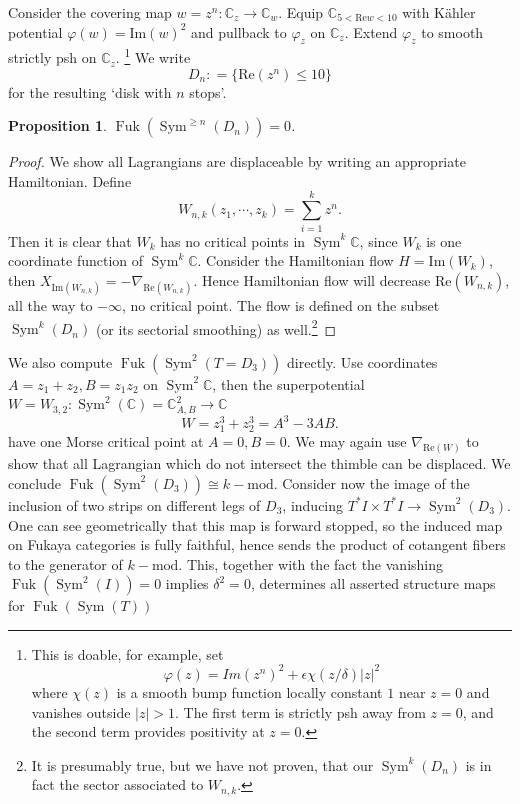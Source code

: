\documentclass{article}
\def\C{\mathbb{C}}
\DeclareMathOperator{\Sym}{Sym}
\DeclareMathOperator{\Fuk}{Fuk}
\renewcommand{\Im}{\mathrm{Im}}
\renewcommand{\Re}{\mathrm{Re}}
\newtheorem{proposition}[theorem]{Proposition}
\theoremstyle{definition}
\begin{document}
Consider the covering map $w=z^n : \C_z \to \C_w$. Equip $\C_{5 < \Re w < 10}$ with K\"ahler potential $\varphi(w) = \Im(w)^2$ and pullback to $\varphi_z$ on $\C_z$. Extend 
    $\varphi_z$ to smooth strictly psh on $\C_z$. \footnote{This is doable, for example, set
    $$ \varphi(z) = Im(z^n)^2 + \epsilon \chi(z/\delta) |z|^2 $$
    where $\chi(z)$ is a smooth bump function locally constant $1$ near $z=0$ and vanishes outside $|z|>1$. The first term is strictly psh away from $z=0$, and the second term provides positivity at $z=0$.}
    We write  
    $$D_n: = \{ \Re(z^n) \leq 10\}$$ for the resulting  `disk with $n$ stops'. 
    
\begin{proposition}
    $\Fuk (\Sym^{\ge n}(D_n))=0$. 
\end{proposition}
\begin{proof}
    We show all Lagrangians are displaceable by writing an appropriate Hamiltonian. 
    Define 
    $$ W_{n,k} (z_1, \cdots, z_k) = \sum_{i=1}^k z^n. $$
    Then it is clear that $W_k$ has no critical points in $\Sym^k \C$, since $W_k$ is one coordinate function of $\Sym^k \C$.
    Consider the Hamiltonian flow $H = \Im(W_k)$, then $X_{\Im(W_{n,k})} = -\nabla_{\Re(W_{n,k})}$. Hence Hamiltonian flow will decrease $\Re(W_{n,k})$, all the way to $-\infty$, no critical point. The flow is defined on the subset $\Sym^k(D_n)$ (or its sectorial smoothing) as well.\footnote{It is presumably true, but we have not proven, that our $\Sym^{k}(D_n)$ is in fact the sector associated to $W_{n,k}$.} 
\end{proof}

We also compute $\Fuk(\Sym^2(T=D_3))$ directly. Use coordinates $A=z_1+z_2, B=z_1 z_2$ on $\Sym^2 \C$, then the superpotential $W=W_{3,2}:\Sym^2(\C) = \C^2_{A,B} \to \C$
$$ W=z_1^3 + z_2^3 =  A^3 - 3 AB. $$ 
have one Morse critical point at $A=0, B=0$. We may again use $\nabla_{\Re(W)}$ to show that all Lagrangian which do not intersect the thimble can be displaced. We conclude $\Fuk(\Sym^2(D_3)) \cong k-\mathrm{mod}$.  Consider now the image of the inclusion of two strips on different legs of $D_3$, inducing $T^*I \times T^*I \to \Sym^2(D_3)$.  One can see geometrically that this map is forward stopped, so the induced map on Fukaya categories is fully faithful, hence sends the product of cotangent fibers to the generator of $k-\mathrm{mod}$.  This, together with the fact the vanishing $\Fuk(\Sym^2(I)) = 0$ implies $\delta^2 =0$, determines all asserted structure maps for $\Fuk(\Sym(T))$ 
\end{document}
